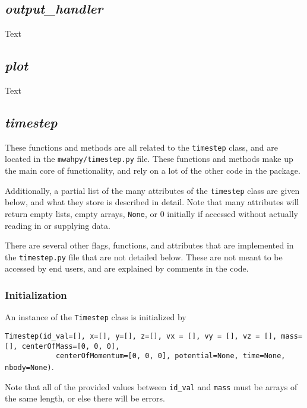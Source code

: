 \documentclass{article}
\begin{document}
\subsection{\textit{output\_handler}}

Text

\subsection{\textit{plot}}

Text

\subsection{\textit{timestep}} \label{sec:doc_timestep}

These functions and methods are all related to the \verb!timestep! class, and are located in the \verb!mwahpy/timestep.py! file. These functions and methods make up the main core of \mwahpy functionality, and rely on a lot of the other code in the package.

Additionally, a partial list of the many attributes of the \verb!timestep! class are given below, and what they store is described in detail. Note that many attributes will return empty lists, empty arrays, \verb!None!, or 0 initially if accessed without actually reading in or supplying data. 

There are several other flags, functions, and attributes that are implemented in the \verb!timestep.py! file that are not detailed below. These are not meant to be accessed by end users, and are explained by comments in the code.

\subsubsection{Initialization}

An instance of the \verb!Timestep! class is initialized by 

\verb!Timestep(id_val=[], x=[], y=[], z=[], vx = [], vy = [], vz = [], mass=[], centerOfMass=[0, 0, 0],! \\ \verb!            centerOfMomentum=[0, 0, 0], potential=None, time=None, nbody=None)!.

Note that all of the provided values between \verb!id_val! and \verb!mass! must be arrays of the same length, or else there will be errors. 
\end{document}
